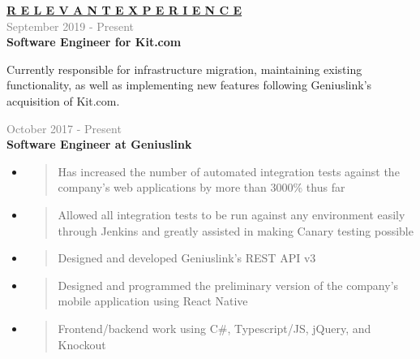 \documentclass[letterpage]{article}
\begin{document}
\begin{minipage}[t]{0.63\linewidth}
\vspace{0pt}
\textbf{\fontsize{14px}{1px}\selectfont
  \ul{R E L E V A N T \:\: E X P E R I E N C E}
}\\

\vspace{7px}
\textcolor{gray}{September 2019 - Present}\\
\textbf{\textsf{Software Engineer for Kit.com}}\\
\raggedright
Currently responsible for infrastructure migration,
maintaining existing functionality, as well as implementing
new features following Geniuslink's acquisition of Kit.com.

\vspace{7px}
\textcolor{gray}{October 2017 - Present}\\
\textbf{\textsf{Software Engineer at Geniuslink}}
\begin{itemize}[leftmargin=*,labelindent=1mm,labelsep=0mm]
\item
  \begin{quote}
  \raggedright
  Has increased the number of automated integration tests
  against the company's web applications by more than 3000\% thus far
  \end{quote}
\item
  \begin{quote}
  \raggedright
  Allowed all integration tests to be run against any
  environment easily through Jenkins and greatly
  assisted in making Canary testing possible
  \end{quote}
\item
  \begin{quote}
  \raggedright
  Designed and developed Geniuslink's REST API v3
  \end{quote}
\item
  \begin{quote}
  \raggedright
  Designed and programmed the preliminary version of the company's mobile
  application using React Native
  \end{quote}
\item
  \begin{quote}
  \raggedright
  Frontend/backend work using C\#, Typescript/JS,
  jQuery, and Knockout
  \end{quote}
\end{itemize}


\end{minipage}
\end{document}
